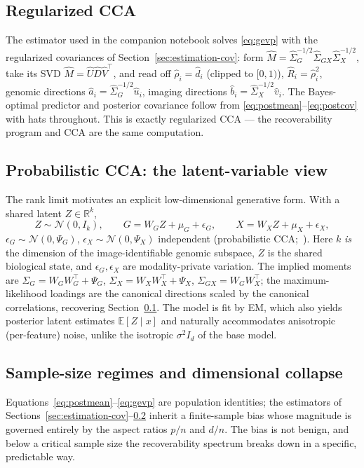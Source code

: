 \documentclass{article}
\newcommand{\R}{\mathbb{R}}
\newcommand{\E}{\mathbb{E}}
\newcommand{\N}{\mathcal{N}}
\newcommand{\Sg}{\Sigma_{G}}
\newcommand{\Sx}{\Sigma_{X}}
\newcommand{\Sgx}{\Sigma_{GX}}
\newcommand{\T}{^{\top}}
\begin{document}
\subsection{Regularized CCA}
\label{sec:estimation-cca}
The estimator used in the companion notebook solves \eqref{eq:gevp} with the
regularized covariances of Section~\ref{sec:estimation-cov}: form
$\hat M = \hat\Sg^{-1/2} \hat\Sgx \hat\Sx^{-1/2}$, take its SVD
$\hat M = \hat U \hat D \hat V\T$, and read off
$\hat\rho_i = \hat d_i$ (clipped to $[0,1)$),
$\hat R_i = \hat\rho_i^2$, genomic directions $\hat a_i = \hat\Sg^{-1/2}\hat u_i$,
imaging directions $\hat b_i = \hat\Sx^{-1/2}\hat v_i$. The Bayes-optimal
predictor and posterior covariance follow from
\eqref{eq:postmean}--\eqref{eq:postcov} with hats throughout. This is exactly
regularized CCA --- the recoverability program and CCA are the same computation.

\subsection{Probabilistic CCA: the latent-variable view}
\label{sec:estimation-pcca}
The rank limit motivates an explicit low-dimensional generative form. With a
shared latent $Z \in \R^{k}$,
\begin{equation}
Z \sim \N(0, I_k), \qquad
G = W_G Z + \mu_G + \epsilon_G, \qquad
X = W_X Z + \mu_X + \epsilon_X,
\label{eq:pcca}
\end{equation}
$\epsilon_G \sim \N(0, \Psi_G)$, $\epsilon_X \sim \N(0, \Psi_X)$ independent
(probabilistic CCA;~\citealp{bach2005pcca}). Here $k$ \emph{is} the dimension of
the image-identifiable genomic subspace, $Z$ is the shared biological state, and
$\epsilon_G, \epsilon_X$ are modality-private variation. The implied moments are
$\Sg = W_G W_G\T + \Psi_G$, $\Sx = W_X W_X\T + \Psi_X$,
$\Sgx = W_G W_X\T$; the maximum-likelihood loadings are the canonical directions
scaled by the canonical correlations, recovering Section~\ref{sec:estimation-cca}.
The model is fit by EM, which also yields posterior latent estimates
$\E[Z \mid x]$ and naturally accommodates anisotropic (per-feature) noise, unlike
the isotropic $\sigma^2 I_d$ of the base model.

\subsection{Sample-size regimes and dimensional collapse}
\label{sec:estimation-regimes}
Equations~\eqref{eq:postmean}--\eqref{eq:gevp} are population identities; the
estimators of Sections~\ref{sec:estimation-cov}--\ref{sec:estimation-pcca}
inherit a finite-sample bias whose magnitude is governed entirely by the
aspect ratios $p/n$ and $d/n$. The bias is not benign, and below a critical
sample size the recoverability spectrum breaks down in a specific, predictable
way.
\end{document}
